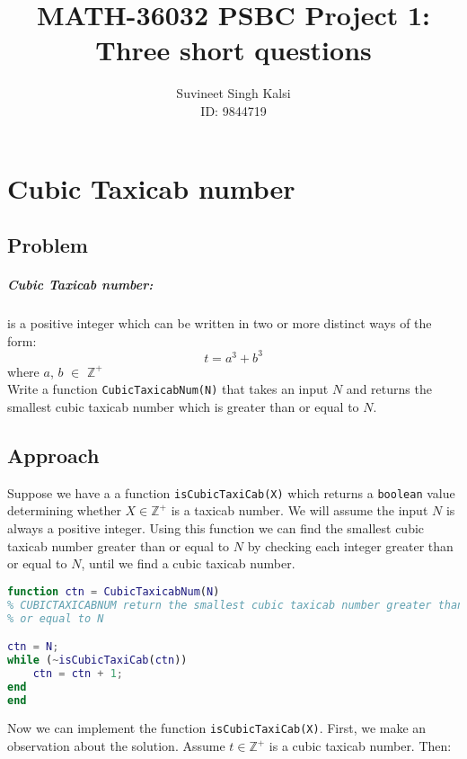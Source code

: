 \documentclass[12pt]{report}
\title{MATH-36032 PSBC Project 1: Three short questions}
\author{Suvineet Singh Kalsi \\ ID: 9844719}
\date{}
\begin{document}
\maketitle

\chapter{Cubic Taxicab number}

\section*{Problem}
\paragraph{Cubic Taxicab number:}
is a positive integer which can be written in two or more distinct ways of the form:
\begin{equation*}
	t = a^3 + b^3
\end{equation*} where $a$, $b$ $\in$ $\mathbb{Z^+}$ \\

Write a function \texttt{CubicTaxicabNum(N)} that takes an input $N$ and returns the smallest cubic taxicab number which is greater than or equal to $N$.

\section{Approach}
Suppose we have a a function \texttt{isCubicTaxiCab(X)} which returns a \texttt{boolean} value determining whether $X \in \mathbb{Z^+}$ is a taxicab number. We will assume the input $N$ is always a positive integer. Using this function we can find the smallest cubic taxicab number greater than or equal to $N$ by checking each integer greater than or equal to $N$, until we find a cubic taxicab number. \\

\begin{lstlisting}[language=Matlab]
function ctn = CubicTaxicabNum(N)
% CUBICTAXICABNUM return the smallest cubic taxicab number greater than
% or equal to N

ctn = N;
while (~isCubicTaxiCab(ctn))
    ctn = ctn + 1;
end
end
\end{lstlisting}

Now we can implement the function \texttt{isCubicTaxiCab(X)}. First, we make an observation about the solution. Assume $t \in \mathbb{Z^+}$ is a cubic taxicab number. Then:
\end{document}
